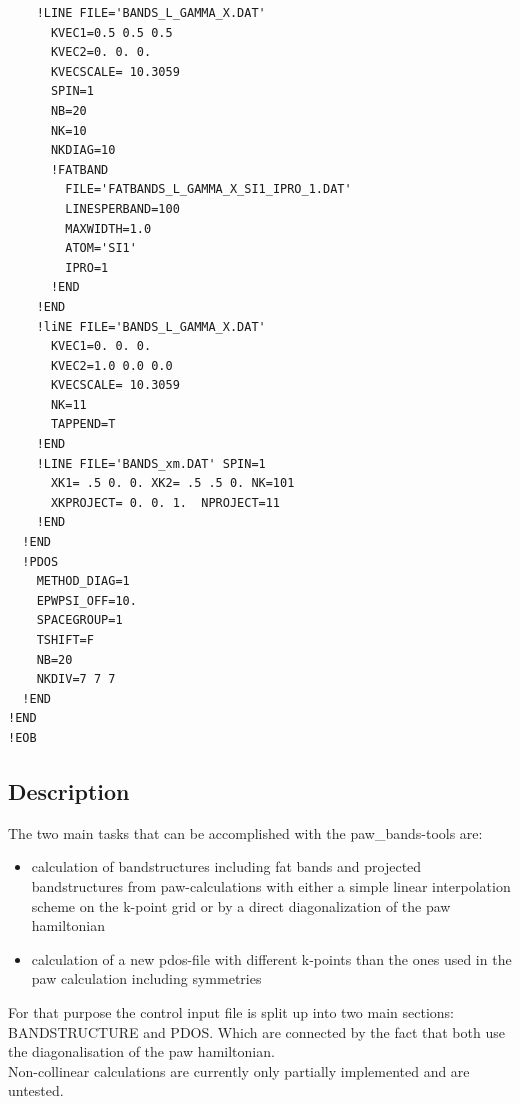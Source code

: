 \documentclass[final,12pt]{article}
\begin{document}
{{{{{{\begin{verbatim}
    !LINE FILE='BANDS_L_GAMMA_X.DAT'
      KVEC1=0.5 0.5 0.5   
      KVEC2=0. 0. 0. 
      KVECSCALE= 10.3059  
      SPIN=1
      NB=20
      NK=10
      NKDIAG=10
      !FATBAND 
        FILE='FATBANDS_L_GAMMA_X_SI1_IPRO_1.DAT'
        LINESPERBAND=100
        MAXWIDTH=1.0
        ATOM='SI1'
        IPRO=1
      !END
    !END
    !liNE FILE='BANDS_L_GAMMA_X.DAT'
      KVEC1=0. 0. 0. 
      KVEC2=1.0 0.0 0.0   
      KVECSCALE= 10.3059      
      NK=11
      TAPPEND=T
    !END
    !LINE FILE='BANDS_xm.DAT' SPIN=1
      XK1= .5 0. 0. XK2= .5 .5 0. NK=101 
      XKPROJECT= 0. 0. 1.  NPROJECT=11 
    !END
  !END
  !PDOS
    METHOD_DIAG=1
    EPWPSI_OFF=10.
    SPACEGROUP=1
    TSHIFT=F
    NB=20
    NKDIV=7 7 7
  !END
!END
!EOB
\end{verbatim}

\subsection{Description}

The two main tasks that can be accomplished with the paw\_bands-tools are:
\begin{itemize} 
  \item calculation of bandstructures including fat bands and
      projected bandstructures from paw-calculations with either a simple linear
      interpolation scheme on the k-point grid or by a direct diagonalization of
      the paw hamiltonian
  \item calculation of a new pdos-file with different k-points than 
    the ones used in the paw calculation including symmetries
\end{itemize}

For that purpose the control input file is split up into two main sections:
BANDSTRUCTURE and PDOS. Which are connected by the fact that both use the
diagonalisation of the paw hamiltonian.\\ Non-collinear calculations are
currently only partially implemented and  are untested.

}}}}}}
\end{document}
